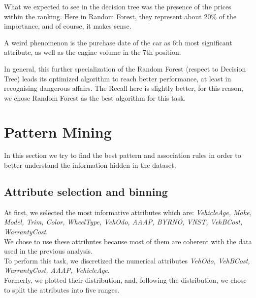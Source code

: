 \documentclass{article}
\begin{document}
	What we expected to see in the decision tree was the presence of the prices within the ranking. Here in Random Forest, they represent about 20\% of the importance, and of course, it makes sense. 
	
	A weird phenomenon is the purchase date of the car as 6th most significant attribute, as well as the engine volume in the 7th position. 
	
	In general, this further specialization of the Random Forest (respect to Decision Tree) leads its optimized algorithm to reach better performance, at least in recognising dangerous affairs. The Recall here is slightly better, for this reason, we chose Random Forest as the best algorithm for this task.
	
	\newpage
	\section{Pattern Mining}
	\label{sec:patternmining}
	In this section we try to find the best pattern and association rules in order to better understand the information hidden in the dataset.
	
	\subsection{Attribute selection and binning}
	
	At first, we selected the most informative attributes which are: \emph{VehicleAge, Make, Model, Trim, Color, WheelType, VehOdo, AAAP, BYRNO, VNST, VehBCost, WarrantyCost}.\\
	We chose to use these attributes because most of them are coherent with the data used in the previous analysis.\\  
	To perform this task, we discretized the numerical attributes \emph{VehOdo, VehBCost, WarrantyCost, AAAP, VehicleAge}.\\
	Formerly, we plotted their distribution, and, following the distribution, we chose to split the attributes into five ranges.\\  
	
\end{document}
